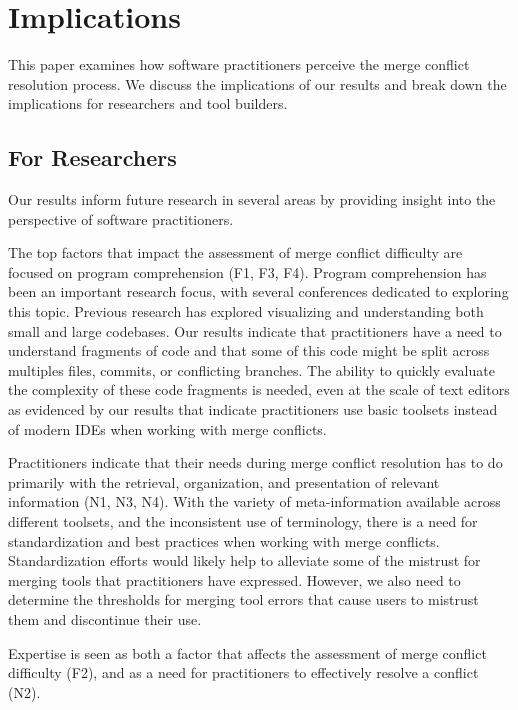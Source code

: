 \section{Implications}\label{implications}
This paper examines how software practitioners perceive the merge conflict resolution process.
We discuss the implications of our results and break down the implications for researchers and tool builders.

\subsection{For Researchers}
Our results inform future research in several areas by providing insight into the perspective of software practitioners.

The top factors that impact the assessment of merge conflict difficulty are focused on program comprehension (F1, F3, F4).
Program comprehension has been an important research focus, with several conferences dedicated to exploring this topic.
Previous research has explored visualizing and understanding both small and large codebases.
Our results indicate that practitioners have a need to understand fragments of code and that some of this code might be split across multiples files, commits, or conflicting branches.
The ability to quickly evaluate the complexity of these code fragments is needed, even at the scale of text editors as evidenced by our results that indicate practitioners use basic toolsets instead of modern IDEs when working with merge conflicts.

Practitioners indicate that their needs during merge conflict resolution has to do primarily with the retrieval, organization, and presentation of relevant information (N1, N3, N4).
With the variety of meta-information available across different toolsets, and the inconsistent use of terminology, there is a need for standardization and best practices when working with merge conflicts.
Standardization efforts would likely help to alleviate some of the mistrust for merging tools that practitioners have expressed.
However, we also need to determine the thresholds for merging tool errors that cause users to mistrust them and discontinue their use.

Expertise is seen as both a factor that affects the assessment of merge conflict difficulty (F2), and as a need for practitioners to effectively resolve a conflict (N2).

